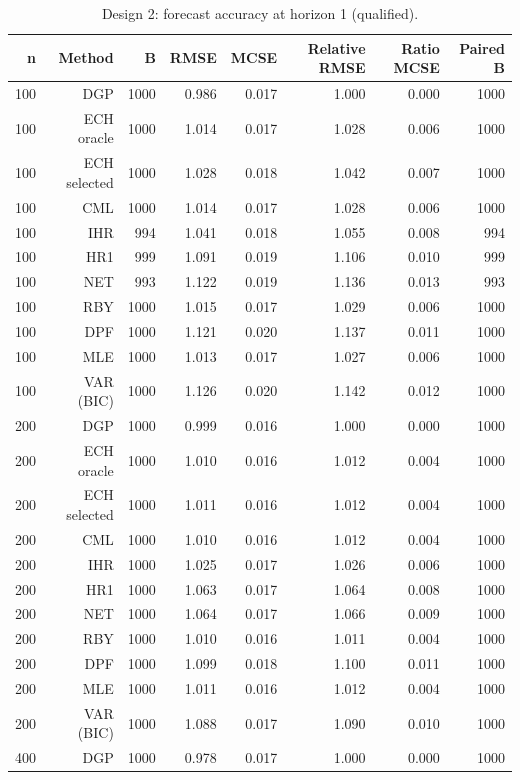 \begin{table}[p]\centering
\caption{Design 2: forecast accuracy at horizon 1 (qualified).}
\small
\begin{tabular}{rrrrrrrr}\toprule
n & Method & B & RMSE & MCSE & Relative RMSE & Ratio MCSE & Paired B \\\midrule
100 & DGP & 1000 & 0.986 & 0.017 & 1.000 & 0.000 & 1000 \\
100 & ECH oracle & 1000 & 1.014 & 0.017 & 1.028 & 0.006 & 1000 \\
100 & ECH selected & 1000 & 1.028 & 0.018 & 1.042 & 0.007 & 1000 \\
100 & CML & 1000 & 1.014 & 0.017 & 1.028 & 0.006 & 1000 \\
100 & IHR &  994 & 1.041 & 0.018 & 1.055 & 0.008 &  994 \\
100 & HR1 &  999 & 1.091 & 0.019 & 1.106 & 0.010 &  999 \\
100 & NET &  993 & 1.122 & 0.019 & 1.136 & 0.013 &  993 \\
100 & RBY & 1000 & 1.015 & 0.017 & 1.029 & 0.006 & 1000 \\
100 & DPF & 1000 & 1.121 & 0.020 & 1.137 & 0.011 & 1000 \\
100 & MLE & 1000 & 1.013 & 0.017 & 1.027 & 0.006 & 1000 \\
100 & VAR (BIC) & 1000 & 1.126 & 0.020 & 1.142 & 0.012 & 1000 \\
200 & DGP & 1000 & 0.999 & 0.016 & 1.000 & 0.000 & 1000 \\
200 & ECH oracle & 1000 & 1.010 & 0.016 & 1.012 & 0.004 & 1000 \\
200 & ECH selected & 1000 & 1.011 & 0.016 & 1.012 & 0.004 & 1000 \\
200 & CML & 1000 & 1.010 & 0.016 & 1.012 & 0.004 & 1000 \\
200 & IHR & 1000 & 1.025 & 0.017 & 1.026 & 0.006 & 1000 \\
200 & HR1 & 1000 & 1.063 & 0.017 & 1.064 & 0.008 & 1000 \\
200 & NET & 1000 & 1.064 & 0.017 & 1.066 & 0.009 & 1000 \\
200 & RBY & 1000 & 1.010 & 0.016 & 1.011 & 0.004 & 1000 \\
200 & DPF & 1000 & 1.099 & 0.018 & 1.100 & 0.011 & 1000 \\
200 & MLE & 1000 & 1.011 & 0.016 & 1.012 & 0.004 & 1000 \\
200 & VAR (BIC) & 1000 & 1.088 & 0.017 & 1.090 & 0.010 & 1000 \\
400 & DGP & 1000 & 0.978 & 0.017 & 1.000 & 0.000 & 1000 \\

\end{tabular}
\end{table}
